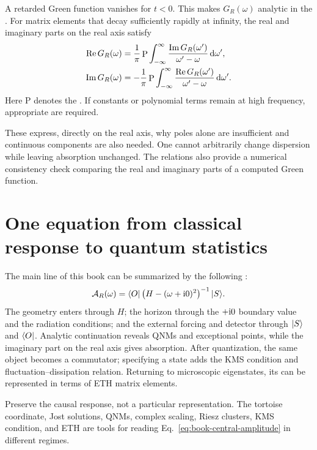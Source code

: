A retarded Green function vanishes for $t<0$. This  makes $G_R(\omega)$ analytic in the . For matrix elements that decay sufficiently rapidly at infinity, the real and imaginary parts on the real axis satisfy
\begin{align}
\operatorname{Re} G_R(\omega)
&=
\frac{1}{\pi}
\mathop{\mathrm{P}}
\int_{-\infty}^{\infty}
\frac{\operatorname{Im} G_R(\omega')}{\omega'-\omega}
\,\mathrm{d}\omega',
\label{eq:kramers-kronig-real}
\\
\operatorname{Im} G_R(\omega)
&=
-\frac{1}{\pi}
\mathop{\mathrm{P}}
\int_{-\infty}^{\infty}
\frac{\operatorname{Re} G_R(\omega')}{\omega'-\omega}
\,\mathrm{d}\omega'.
\label{eq:kramers-kronig-imag}
\end{align}
Here $\mathrm P$ denotes the . If constants or polynomial terms remain at high frequency, appropriate  are required.

These  express, directly on the real axis, why poles alone are insufficient and continuous components are also needed. One cannot arbitrarily change dispersion while leaving absorption unchanged. The relations also provide a numerical consistency check comparing the real and imaginary parts of a computed Green function.

\section{One equation from classical response to quantum statistics}

The main line of this book can be summarized by the following :
\begin{equation}
\mathcal{A}_R(\omega)
=
\langle O \rvert
\left(
H-(\omega+\mathrm{i}0)^2
\right)^{-1}
\lvert S \rangle.
\label{eq:book-central-amplitude}
\end{equation}
The geometry enters through $H$; the horizon through the $+\mathrm{i}0$ boundary value and the radiation conditions; and the external forcing and detector through $\lvert S \rangle$ and $\langle O \rvert$. Analytic continuation reveals QNMs and exceptional points, while the imaginary part on the real axis gives absorption. After quantization, the same object becomes a commutator; specifying a state adds the KMS condition and fluctuation--dissipation relation. Returning to microscopic eigenstates, its  can be represented in terms of ETH matrix elements.

\begin{principlebox}
Preserve the causal response, not a particular representation. The tortoise coordinate, Jost solutions, QNMs, complex scaling, Riesz clusters, KMS condition, and ETH are tools for reading Eq.~\eqref{eq:book-central-amplitude} in different regimes.
\end{principlebox}

